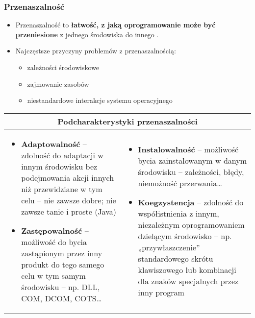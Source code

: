 \documentclass[../main.tex]{subfiles}
\begin{document}
    \subsubsection{Przenaszalność}
    \begin{itemize}
        \item Przenaszalność to \textbf{łatwość, z jaką oprogramowanie może być przeniesione} z jednego środowiska do innego .
        \item Najczęstsze przyczyny problemów z przenaszalnością:
        \begin{itemize}
            \item zależności środowiskowe
            \item zajmowanie zasobów
            \item niestandardowe interakcje systemu operacyjnego
        \end{itemize}
    \end{itemize}

    \begin{table}[H]
        \begin{center}
            \begin{tabular}{| p{8cm} | p{8cm} |}
                \hline
                \multicolumn{2}{|c|}{\textbf{Podcharakterystyki przenaszalności}}\\
                \hline
                \begin{itemize}
                    \item \textbf{Adaptowalność} – zdolność do adaptacji w innym środowisku bez
                    podejmowania akcji innych niż przewidziane w tym celu – nie zawsze dobre; nie zawsze tanie i proste (Java)
                    \item \textbf{Zastępowalność} – możliwość do bycia zastąpionym przez inny
                    produkt do tego samego celu w tym samym środowisku – np. DLL, COM, DCOM, COTS…
                \end{itemize}
                &
                \begin{itemize}
                    \item \textbf{Instalowalność} – możliwość bycia zainstalowanym w danym środowisku
                    – zależności, błędy, niemożność przerwania…
                    \item \textbf{Koegzystencja} – zdolność do współistnienia z innym, niezależnym oprogramowaniem dzielącym środowisko
                    – np. „przywłaszczenie” standardowego skrótu klawiszowego lub kombinacji dla znaków specjalnych przez inny program
                \end{itemize}\\
                \hline
            \end{tabular}
        \end{center}
    \end{table}
\end{document}
